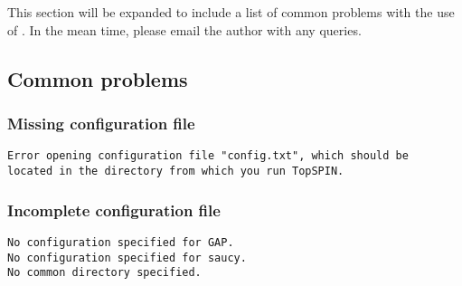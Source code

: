 \chapter{\troubleshooting}\label{chapter:troubleshooting}

This section will be expanded to include a list of common problems
with the use of \topspin.  In the mean time, please email the author
with any queries.


\section{Common problems}\label{sec:troubleshooting:common}


\subsection{Missing configuration file}


\exampleerrormessage

\begin{lstlisting}
Error opening configuration file "config.txt", which should be
located in the directory from which you run TopSPIN.
\end{lstlisting}



\subsection{Incomplete configuration file}


\exampleerrormessage

\begin{lstlisting}
No configuration specified for GAP.
No configuration specified for saucy.
No common directory specified.
\end{lstlisting}


